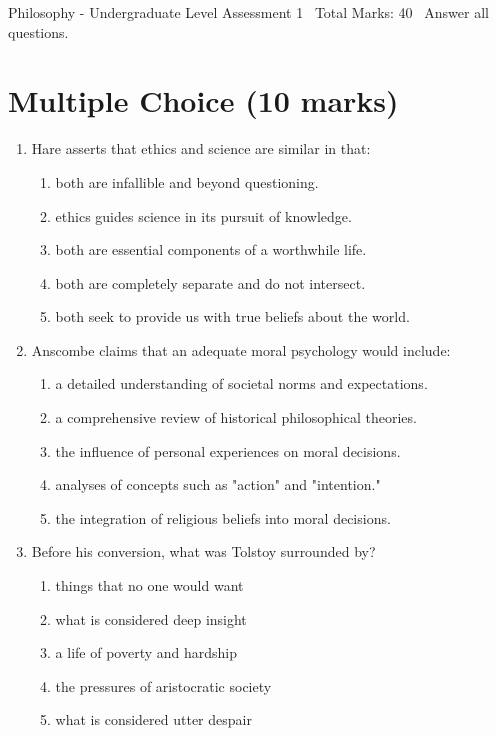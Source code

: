 \documentclass[12pt]{article}
\begin{document}
\begin{center}
Philosophy - Undergraduate Level Assessment 1 \
Total Marks: 40 \
Answer all questions.
\end{center}

\section*{Multiple Choice (10 marks)}
\begin{enumerate}[label=\arabic*.]
\item Hare asserts that ethics and science are similar in that:
\begin{enumerate}[label=(\alph*)]
    \item both are infallible and beyond questioning.
    \item ethics guides science in its pursuit of knowledge.
    \item both are essential components of a worthwhile life.
    \item both are completely separate and do not intersect.
    \item both seek to provide us with true beliefs about the world.
\end{enumerate}
\item Anscombe claims that an adequate moral psychology would include:
\begin{enumerate}[label=(\alph*)]
    \item a detailed understanding of societal norms and expectations.
    \item a comprehensive review of historical philosophical theories.
    \item the influence of personal experiences on moral decisions.
    \item analyses of concepts such as "action" and "intention."
    \item the integration of religious beliefs into moral decisions.
\end{enumerate}
\item Before his conversion, what was Tolstoy surrounded by?
\begin{enumerate}[label=(\alph*)]
    \item things that no one would want
    \item what is considered deep insight
    \item a life of poverty and hardship
    \item the pressures of aristocratic society
    \item what is considered utter despair

\end{enumerate}
\end{enumerate}
\end{document}
